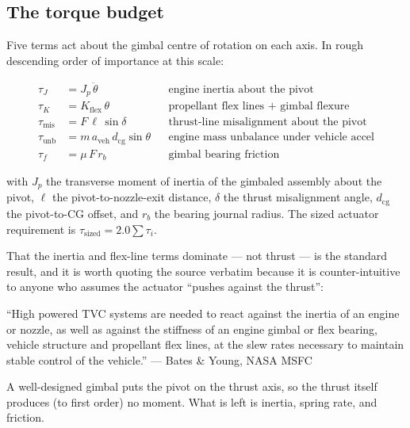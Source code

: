 \documentclass[11pt]{article}
\begin{document}
\subsection{The torque budget}

Five terms act about the gimbal centre of rotation on each axis. In rough
descending order of importance at this scale:

\begin{align}
\tau_J    &= J_p\,\ddot\theta                                  &&\text{engine inertia about the pivot}\\
\tau_K    &= K_{\text{flex}}\,\theta                            &&\text{propellant flex lines + gimbal flexure}\\
\tau_{\text{mis}} &= F\,\ell\,\sin\delta                        &&\text{thrust-line misalignment about the pivot}\\
\tau_{\text{unb}} &= m\,a_{\text{veh}}\,d_{\text{cg}}\sin\theta &&\text{engine mass unbalance under vehicle accel}\\
\tau_f    &= \mu\,F\,r_b                                        &&\text{gimbal bearing friction}
\end{align}

with $J_p$ the transverse moment of inertia of the gimbaled assembly about
the pivot, $\ell$ the pivot-to-nozzle-exit distance, $\delta$ the thrust
misalignment angle, $d_{\text{cg}}$ the pivot-to-CG offset, and $r_b$ the
bearing journal radius. The sized actuator requirement is
$\tau_{\text{sized}} = 2.0 \sum \tau_i$.

That the inertia and flex-line terms dominate --- not thrust --- is the
standard result, and it is worth quoting the source verbatim because it is
counter-intuitive to anyone who assumes the actuator ``pushes against the
thrust'':

\begin{keybox}
``High powered TVC systems are needed to react against the inertia of an
engine or nozzle, as well as against the stiffness of an engine gimbal or
flex bearing, vehicle structure and propellant flex lines, at the slew rates
necessary to maintain stable control of the vehicle.''
\hfill --- Bates \& Young, NASA MSFC~\cite{bates2012}
\end{keybox}

A well-designed gimbal puts the pivot on the thrust axis, so the thrust
itself produces (to first order) no moment. What is left is inertia, spring
rate, and friction.
\end{document}
